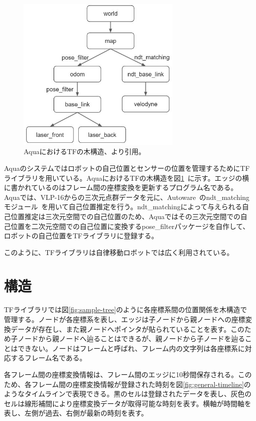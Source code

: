 \documentclass[a4paper]{jreport}	%
\begin{document}
\begin{figure}[h] 
\centering
\includegraphics[width=8cm]{aqua-tf.jpeg}	
\caption{AquaにおけるTFの木構造、\cite{Aqua}より引用。}
\label{fig:aqua-tf}
\end{figure}

Aquaのシステムではロボットの自己位置とセンサーの位置を管理するためにTFライブラリを用いている。AquaにおけるTFの木構造を図\ref{fig:aqua-tf}~\cite{Aqua}に示す。エッジの横に書かれているのはフレーム間の座標変換を更新するプログラム名である。  Aquaでは、VLP-16からの三次元点群データを元に、Autoware~\cite{autoware}のndt\_matchingモジュール~\cite{ndt_matching}を用いて自己位置推定を行う。ndt\_matchingによって与えられる自己位置推定は三次元空間での自己位置のため、Aquaではその三次元空間での自己位置を二次元空間での自己位置に変換するpose\_filterパッケージを自作して、ロボットの自己位置をTFライブラリに登録する。

このように、TFライブラリは自律移動ロボットでは広く利用されている。

\section{構造}
TFライブラリでは図\ref{fig:sample-tree}のように各座標系間の位置関係を木構造で管理する。ノードが各座標系を表し、エッジは子ノードから親ノードへの座標変換データが存在し、また親ノードへポインタが貼られていることを表す。このため子ノードから親ノードへ辿ることはできるが、親ノードから子ノードを辿ることはできない。ノードはフレームと呼ばれ、フレーム内の文字列は各座標系に対応するフレーム名である。

各フレーム間の座標変換情報は、フレーム間のエッジに10秒間保存される。このため、各フレーム間の座標変換情報が登録された時刻を図\ref{fig:general-timeline}のようなタイムラインで表現できる。黒のセルは登録されたデータを表し、灰色のセルは線形補間により座標変換データが取得可能な時刻を表す。横軸が時間軸を表し、左側が過去、右側が最新の時刻を表す。
\end{document}
